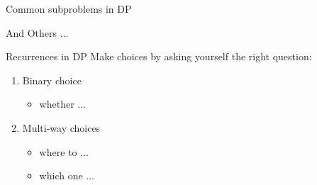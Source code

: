 \begin{frame}{Common subproblems in DP}
  \centerline{\huge And Others $\dots$}
\end{frame}
\begin{frame}{Recurrences in DP}
  Make choices by asking yourself the right question:
  \begin{enumerate}
	\item Binary choice
	  \begin{itemize}
		\item whether $\dots$
	  \end{itemize}
	\item Multi-way choices
	  \begin{itemize}
		\item where to $\dots$ 
		\item which one $\dots$
	  \end{itemize}
  \end{enumerate}
\end{frame}
